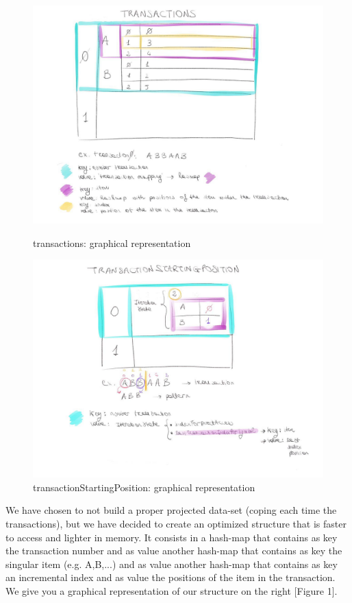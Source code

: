 \documentclass[10pt, a4paper]{article}
\begin{document}
	\begin{figure}
		\centering
		\includegraphics[scale =0.25]{transactions.jpg}
		\caption{{\small  transactions: graphical representation}}
		\vspace{0.5cm}
		\includegraphics[scale =0.25]{transactionStartingPosition.jpg}
		\caption{{\small transactionStartingPosition: graphical representation}}
	\end{figure}
	We have chosen to not build a proper projected data-set (coping each time the transactions), but we have decided to create an optimized structure that is faster to access and lighter in memory. It consists in a hash-map that contains as key the transaction number and as value another hash-map that contains as key the singular item (e.g. A,B,...) and as value another hash-map that contains as key an incremental index and as value the positions of the item in the transaction. We give you a graphical representation of our structure on the right [Figure 1].
\end{document}
